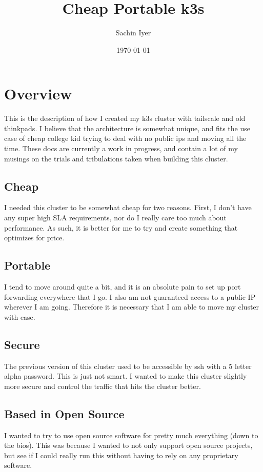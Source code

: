 \documentclass[12pt]{article}
\title{Cheap Portable k3s}
\author{Sachin Iyer}
\date{\today}
\begin{document}
\maketitle
\section{Overview}
This is the description of how I created my k3s cluster with tailscale and old thinkpads. I believe that the architecture is somewhat unique, and fits the use case of cheap college kid trying to deal with no public ips and moving all the time. These docs are currently a work in progress, and contain a lot of my musings on the trials and tribulations taken when building this cluster.

\subsection{Cheap}
I needed this cluster to be somewhat cheap for two reasons. First, I don't have any super high SLA requirements, nor do I really care too much about performance. As such, it is better for me to try and create something that optimizes for price.

\subsection{Portable}
I tend to move around quite a bit, and it is an absolute pain to set up port forwarding everywhere that I go. I also am not guaranteed access to a public IP wherever I am going. Therefore it is necessary that I am able to move my cluster with ease.

\subsection{Secure}
The previous version of this cluster used to be accessible by ssh with a 5 letter alpha password. This is just not smart. I wanted to make this cluster slightly more secure and control the traffic that hits the cluster better.

\subsection{Based in Open Source}
I wanted to try to use open source software for pretty much everything (down to the bios). This was because I wanted to not only support open source projects, but see if I could really run this without having to rely on any proprietary software.
\end{document}
